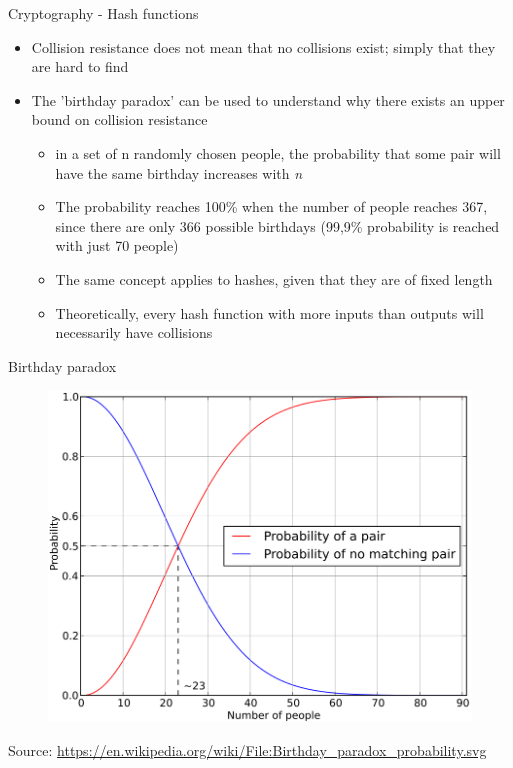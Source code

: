 \documentclass[9pt]{beamer}
\begin{document}


\begin{frame}{Cryptography - Hash functions}
	\begin{itemize}
		\item Collision resistance does not mean that no collisions exist; simply that they are hard to find
		\item The 'birthday paradox' can be used to understand why there exists an upper bound on collision resistance
		\begin{itemize}
			\item in a set of n randomly chosen people, the probability that some pair will have the same birthday increases with \textit{n}
			\item The probability reaches 100\% when the number of people reaches 367, since there are only 366 possible birthdays (99,9\% probability is reached with just 70 people)
			\item The same concept applies to hashes, given that they are of fixed length
			\item Theoretically, every hash function with more inputs than outputs will necessarily have collisions
		\end{itemize}
	\end{itemize}
\end{frame}



\begin{frame}{Birthday paradox}
	\begin{figure}[]
		\centering
		\includegraphics  [scale=0.2]{Images/paradox}
	\end{figure}
	\begin{tiny}
		Source: \href{https://en.wikipedia.org/wiki/File:Birthday_paradox_probability.svg}{https://en.wikipedia.org/wiki/File:Birthday\_paradox\_probability.svg}
	\end{tiny}
\end{frame}
\end{document}
